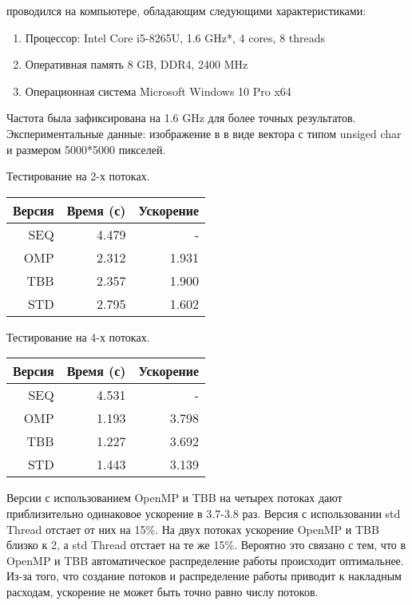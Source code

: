 \documentclass{report}
\begin{document}
     проводился на компьютере, обладающим следующими характеристиками:
    \begin{enumerate}
        \item Процессор: Intel Core i5-8265U, 1.6 GHz*, 4 cores, 8 threads
        \item Оперативная память 8 GB, DDR4, 2400 MHz
        \item Операционная система Microsoft Windows 10 Pro x64
    \end{enumerate}
    \par* Частота была зафиксирована на 1.6 GHz для более точных результатов. \\
    Экспериментальные данные: изображение в в виде вектора с типом unsiged char и размером 5000*5000 пикселей.\\
    \par Тестирование на 2-х потоках.
    \begin{table}[!h]
    \centering
    \begin{tabular}{| r | r | r |}
    \hline
    Версия & Время (с) & Ускорение \\[5pt]
    \hline
    SEQ & 4.479 & -     \\
    OMP & 2.312 & 1.931 \\
    TBB & 2.357 & 1.900 \\
    STD & 2.795 & 1.602 \\
    \hline
    \end{tabular}
    \end{table}
    \par Тестирование на 4-х потоках.
    \begin{table}[!h]
    \centering
    \begin{tabular}{| r | r | r |}
    \hline
    Версия & Время (с) & Ускорение \\[5pt]
    \hline
    SEQ & 4.531 & -     \\
    OMP & 1.193 & 3.798 \\
    TBB & 1.227 & 3.692 \\
    STD & 1.443 & 3.139 \\
    \hline
    \end{tabular}
    \end{table}
    \par Версии с использованием OpenMP и TBB на четырех потоках дают приблизительно одинаковое ускорение в 3.7-3.8 раз. Версия с использовании std Thread отстает от них на 15\%. На двух потоках ускорение OpenMP и TBB близко к 2, а std Thread отстает на те же 15\%. Вероятно это связано с тем, что в OpenMP и TBB автоматическое распределение работы происходит оптимальнее. Из-за того, что создание потоков и распределение работы приводит к накладным расходам, ускорение не может быть точно равно числу потоков.
    
\end{document}
